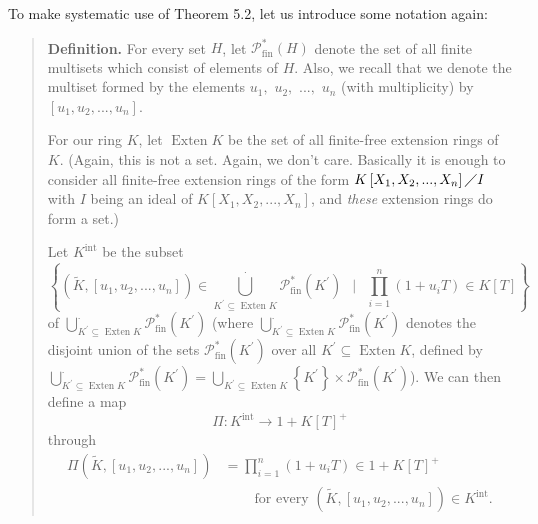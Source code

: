 \documentclass[numbers=enddot,12pt,final,onecolumn,notitlepage]{scrartcl}%
\begin{document}
To make systematic use of Theorem 5.2, let us introduce some notation again:

\begin{quote}
\textbf{Definition.} For every set $H$, let $\mathcal{P}_{\operatorname*{fin}%
}^{\ast}\left(  H\right)  $ denote the set of all finite multisets which
consist of elements of $H$. Also, we recall that we denote the multiset formed
by the elements $u_{1},$ $u_{2},$ $...,$ $u_{n}$ (with multiplicity) by
$\left[  u_{1},u_{2},...,u_{n}\right]  $.

For our ring $K$, let $\operatorname*{Exten}K$ be the set of all finite-free
extension rings of $K$. (Again, this is not a set. Again, we don't care.
Basically it is enough to consider all finite-free extension rings of the form
$K\left[  X_{1},X_{2},...,X_{n}\right]  \diagup I$ with $I$ being an ideal of
$K\left[  X_{1},X_{2},...,X_{n}\right]  $, and \textit{these} extension rings
do form a set.)

Let $K^{\operatorname*{int}}$ be the subset%
\[
\left\{  \left(  \widetilde{K},\left[  u_{1},u_{2},...,u_{n}\right]  \right)
\in\bigcup\limits_{K^{\prime}\subseteq\operatorname*{Exten}K}^{\cdot
}\mathcal{P}_{\operatorname*{fin}}^{\ast}\left(  K^{\prime}\right)
\ \ \mid\ \ \prod\limits_{i=1}^{n}\left(  1+u_{i}T\right)  \in K\left[
T\right]  \right\}
\]
of $\bigcup\limits_{K^{\prime}\subseteq\operatorname*{Exten}K}^{\cdot
}\mathcal{P}_{\operatorname*{fin}}^{\ast}\left(  K^{\prime}\right)  $ (where
$\bigcup\limits_{K^{\prime}\subseteq\operatorname*{Exten}K}^{\cdot}%
\mathcal{P}_{\operatorname*{fin}}^{\ast}\left(  K^{\prime}\right)  $ denotes
the disjoint union of the sets $\mathcal{P}_{\operatorname*{fin}}^{\ast
}\left(  K^{\prime}\right)  $ over all $K^{\prime}\subseteq
\operatorname*{Exten}K$, defined by $\bigcup\limits_{K^{\prime}\subseteq
\operatorname*{Exten}K}^{\cdot}\mathcal{P}_{\operatorname*{fin}}^{\ast}\left(
K^{\prime}\right)  =\bigcup\limits_{K^{\prime}\subseteq\operatorname*{Exten}%
K}\left\{  K^{\prime}\right\}  \times\mathcal{P}_{\operatorname*{fin}}^{\ast
}\left(  K^{\prime}\right)  $). We can then define a map%
\[
\Pi:K^{\operatorname*{int}}\rightarrow1+K\left[  T\right]  ^{+}%
\]
through%
\begin{align*}
\Pi\left(  \widetilde{K},\left[  u_{1},u_{2},...,u_{n}\right]  \right)   &
=\prod\limits_{i=1}^{n}\left(  1+u_{i}T\right)  \in1+K\left[  T\right]  ^{+}\\
&  \ \ \ \ \ \ \ \ \ \ \text{for every }\left(  \widetilde{K},\left[
u_{1},u_{2},...,u_{n}\right]  \right)  \in K^{\operatorname*{int}}.
\end{align*}



\end{quote}
\end{document}
